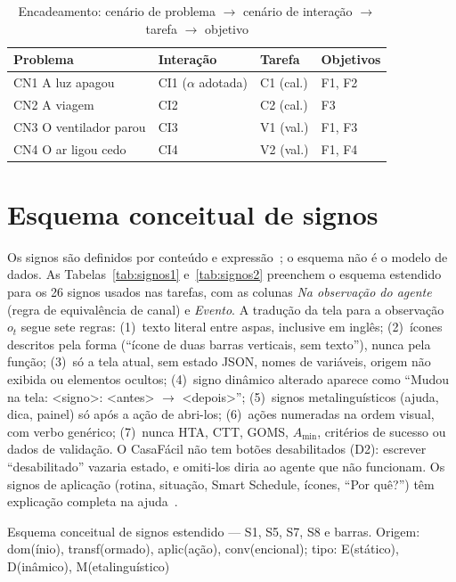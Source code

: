 \documentclass[conference]{IEEEtran}
\begin{document}
\begin{table}[!t]
\caption{Encadeamento: cenário de problema $\rightarrow$ cenário de interação $\rightarrow$ tarefa $\rightarrow$ objetivo}
\label{tab:encadeamento}
\centering
\scriptsize
\begin{tabularx}{\columnwidth}{@{}YYP{1.4cm}P{1.3cm}@{}}
\toprule
\textbf{Problema} & \textbf{Interação} & \textbf{Tarefa} & \textbf{Objetivos} \\
\midrule
CN1 A luz apagou & CI1 ($\alpha$ adotada) & C1 (cal.) & F1, F2 \\
CN2 A viagem & CI2 & C2 (cal.) & F3 \\
CN3 O ventilador parou & CI3 & V1 (val.) & F1, F3 \\
CN4 O ar ligou cedo & CI4 & V2 (val.) & F1, F4 \\
\bottomrule
\end{tabularx}
\end{table}

\section{Esquema conceitual de signos}\label{sec:signos}

Os signos são definidos por conteúdo e expressão~\cite{barbosa2010}; o esquema não é o modelo de dados. As Tabelas~\ref{tab:signos1} e~\ref{tab:signos2} preenchem o esquema estendido para os 26 signos usados nas tarefas, com as colunas \textit{Na observação do agente} (regra de equivalência de canal) e \textit{Evento}. A tradução da tela para a observação $o_t$ segue sete regras: (1)~texto literal entre aspas, inclusive em inglês; (2)~ícones descritos pela forma (``ícone de duas barras verticais, sem texto''), nunca pela função; (3)~só a tela atual, sem estado JSON, nomes de variáveis, origem não exibida ou elementos ocultos; (4)~signo dinâmico alterado aparece como ``Mudou na tela: <signo>: <antes> $\rightarrow$ <depois>''; (5)~signos metalinguísticos (ajuda, dica, painel) só após a ação de abri-los; (6)~ações numeradas na ordem visual, com verbo genérico; (7)~nunca HTA, CTT, GOMS, $A_{\min}$, critérios de sucesso ou dados de validação. O CasaFácil não tem botões desabilitados (D2): escrever ``desabilitado'' vazaria estado, e omiti-los diria ao agente que não funcionam. Os signos de aplicação (rotina, situação, Smart Schedule, ícones, ``Por quê?'') têm explicação completa na ajuda~\cite{barbosa2010}.

\begin{table}[!t]
\caption{Esquema conceitual de signos estendido --- S1, S5, S7, S8 e barras. Origem: dom(ínio), transf(ormado), aplic(ação), conv(encional); tipo: E(stático), D(inâmico), M(etalinguístico)}
\label{tab:signos1}
\centering

\end{table}
\end{document}
